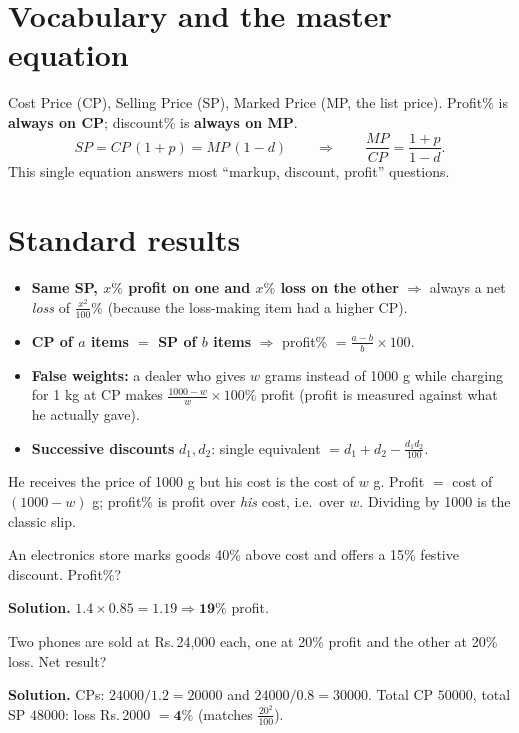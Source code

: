 \documentclass[11pt,a4paper,openany]{report}
\newcommand{\Rs}{Rs.\,}
\begin{document}
\section{Vocabulary and the master equation}
Cost Price (CP), Selling Price (SP), Marked Price (MP, the list price). Profit\% is \textbf{always on CP};
discount\% is \textbf{always on MP}.
\[SP=CP\,(1+p)=MP\,(1-d)\qquad\Rightarrow\qquad\frac{MP}{CP}=\frac{1+p}{1-d}.\]
This single equation answers most ``markup, discount, profit'' questions.

\section{Standard results}
\begin{itemize}
\item \textbf{Same SP, $x\%$ profit on one and $x\%$ loss on the other} $\Rightarrow$ always a net \emph{loss} of $\frac{x^2}{100}\%$ (because the loss-making item had a higher CP).
\item \textbf{CP of $a$ items $=$ SP of $b$ items} $\Rightarrow$ profit\% $=\frac{a-b}{b}\times100$.
\item \textbf{False weights:} a dealer who gives $w$ grams instead of 1000 g while charging for 1 kg at CP makes
$\frac{1000-w}{w}\times100\%$ profit (profit is measured against what he actually gave).
\item \textbf{Successive discounts} $d_1,d_2$: single equivalent $=d_1+d_2-\frac{d_1d_2}{100}$.
\end{itemize}

\begin{why}
He receives the price of 1000 g but his cost is the cost of $w$ g. Profit $=$ cost of $(1000-w)$ g; profit\% is
profit over \emph{his} cost, i.e.\ over $w$. Dividing by 1000 is the classic slip.
\end{why}

\begin{example}
An electronics store marks goods 40\% above cost and offers a 15\% festive discount. Profit\%?

\textbf{Solution.} $1.4\times0.85=1.19\Rightarrow\mathbf{19\%}$ profit.
\end{example}

\begin{example}
Two phones are sold at \Rs24,000 each, one at 20\% profit and the other at 20\% loss. Net result?

\textbf{Solution.} CPs: $24000/1.2=20000$ and $24000/0.8=30000$. Total CP $50000$, total SP $48000$: loss \Rs2000
$=\mathbf{4\%}$ (matches $\frac{20^2}{100}$).
\end{example}
\end{document}
